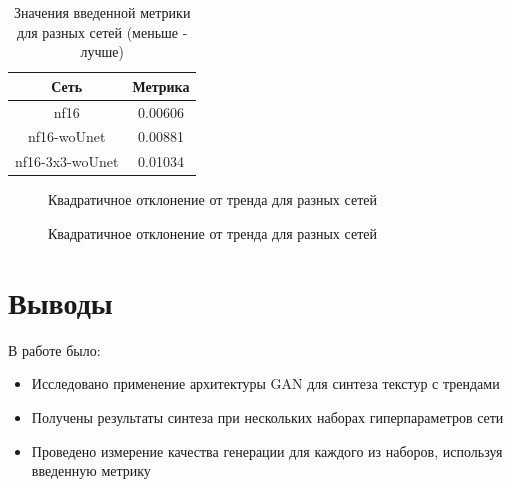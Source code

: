 \documentclass[a4paper]{article}
\begin{document}
		\begin{table}
			\begin{center}
				\begin{tabular}{|c|c|}
					\hline
					Сеть & Метрика \\
					\hline
					nf16 & 0.00606\\
					\hline
					nf16-woUnet & 0.00881\\
					\hline
					nf16-3x3-woUnet & 0.01034\\
					\hline
				\end{tabular}
				\caption{Значения введенной метрики для разных сетей (меньше - лучше)}
				\label{table2}
			\end{center}
		\end{table}
		\begin{figure}
			\caption{Квадратичное отклонение от тренда для разных сетей}
			\label{err1}
		\end{figure}
		\begin{figure}
				\caption{Квадратичное отклонение от тренда для разных сетей}
				\label{err2}
		\end{figure}
	\newpage
	\section{Выводы}
		В работе было:
		\begin{itemize}
			\item Исследовано применение архитектуры GAN для синтеза текстур с трендами
			\item Получены результаты синтеза при нескольких наборах гиперпараметров сети
			\item Проведено измерение качества генерации для каждого из наборов, используя введенную метрику
		\end{itemize}
\end{document}
